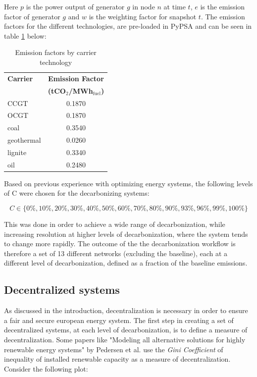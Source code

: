 \documentclass[preprint,12pt,nopreprintline]{elsarticle}
\begin{document}
\medskip
\noindent
Here $p$ is the power output of generator $g$ in node $n$ at time $t$, $e$ is the emission factor of generator $g$ and $w$ is the weighting factor for snapshot $t$. The emission factors for the different technologies, are pre-loaded in PyPSA and can be seen in table \ref{tab:emission_factors} below:

\begin{table}[H]
\centering
\caption{Emission factors by carrier technology}
\label{tab:emission_factors}
\begin{tabular}{lc}
\toprule
\textbf{Carrier} & \textbf{Emission Factor} \\
 & \textbf{(tCO$_2$/MWh$_{\text{fuel}}$)} \\
\midrule
CCGT & 0.1870 \\
OCGT & 0.1870 \\
coal & 0.3540 \\
geothermal & 0.0260 \\
lignite & 0.3340 \\
oil & 0.2480 \\
\bottomrule
\end{tabular}
\end{table}

\medskip
\noindent
Based on previous experience with optimizing energy systems, the following levels of C were chosen for the decarbonizing systems:

\begin{equation}
C \in \{0\%, 10\%, 20\%, 30\%, 40\%, 50\%, 60\%, 70\%, 80\%, 90\%, 93\%, 96\%, 99\%, 100\%\}
\label{decarb_levels}
\end{equation} 

\medskip
\noindent
This was done in order to achieve a wide range of decarbonization, while increasing resolution at higher levels of decarbonization, where the system tends to change more rapidly. The outcome of the the decarbonization workflow is therefore a set of 13 different networks (excluding the baseline), each at a different level of decarbonization, defined as a fraction of the baseline emissions.

\subsection{Decentralized systems}
\noindent
As discussed in the introduction, decentralization is necessary in order to ensure a fair and secure european energy system. The first step in creating a set of decentralized systems, at each level of decarbonization, is to define a measure of decentralization. Some papers like "Modeling all alternative solutions for highly renewable energy systems" by Pedersen et al. \cite{pedersenModelingAllAlternative2021a} use the \textit{Gini Coefficient} of inequality of installed renewable capacity as a measure of decentralization. Consider the following plot:
\end{document}
